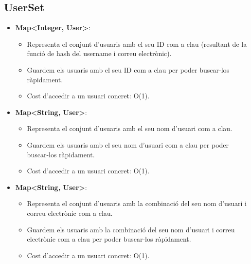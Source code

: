 \documentclass[a4paper, t]{article}
\begin{document}
\subsection{UserSet}
\begin{itemize}
    \item \textbf{Map\textless Integer, User\textgreater}:
    \begin{itemize}
        \item Representa el conjunt d'usuaris amb el seu ID com a clau (resultant de la funció de hash del username i correu electrònic).
        \item Guardem els usuaris amb el seu ID com a clau per poder buscar-los ràpidament.
        \item Cost d’accedir a un usuari concret: O(1).
    \end{itemize}
    \item \textbf{Map\textless String, User\textgreater}:
    \begin{itemize}
        \item Representa el conjunt d'usuaris amb el seu nom d'usuari com a clau.
        \item Guardem els usuaris amb el seu nom d'usuari com a clau per poder buscar-los ràpidament.
        \item Cost d’accedir a un usuari concret: O(1).
    \end{itemize}
    \item \textbf{Map\textless String, User\textgreater}:
    \begin{itemize}
        \item Representa el conjunt d'usuaris amb la combinació del seu nom d'usuari i correu electrònic com a clau.
        \item Guardem els usuaris amb la combinació del seu nom d'usuari i correu electrònic com a clau per poder buscar-los ràpidament.
        \item Cost d’accedir a un usuari concret: O(1).
    \end{itemize}
\end{itemize}
\end{document}
